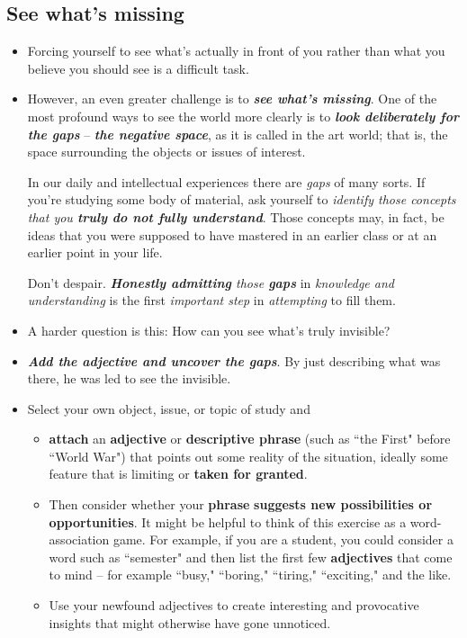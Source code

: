 \documentclass[11pt]{article}
\begin{document}
\subsection{See what's missing}
\begin{itemize}
\item Forcing yourself to see what’s actually in front of you rather than what you believe you should see is a difficult task. 

\item However, an even greater challenge is to \emph{\textbf{see what’s missing}}. One of the most profound ways to see the world more clearly is to \emph{\textbf{look deliberately for the gaps}} -- \emph{\textbf{the negative space}}, as it is called in the art world; that is, the space surrounding the objects or issues of interest. 

In our daily and intellectual experiences there are \emph{gaps} of many sorts. If you’re studying some body of material, ask yourself to \emph{identify those concepts that you \textbf{truly do not fully understand}}. Those concepts may, in fact, be ideas that you were supposed to have mastered in an earlier class or at an earlier point in your life.

Don’t despair. \emph{\textbf{Honestly admitting} those \textbf{gaps}} in \emph{knowledge and understanding} is the first \emph{important step} in \emph{attempting} to fill them. 

\item A harder question is this: How can you see what’s truly invisible?

\item \emph{\textbf{Add the adjective and uncover the gaps}}. By just describing what was there, he was led to see the invisible.

\item \begin{exercise}
Select your own object, issue, or topic of study and 
\begin{itemize}
\item \textbf{attach} an \textbf{adjective} or \textbf{descriptive phrase} (such as ``the First" before ``World War") that points out some reality of the situation, ideally some feature that is limiting or \textbf{taken for granted}. 

\item Then consider whether your \textbf{phrase} \textbf{suggests new possibilities or opportunities}. It might be helpful to think of this exercise as a word-association game. For example, if you are a student, you could consider a word such as ``semester" and then list the first few \textbf{adjectives} that come to mind -- for example ``busy," ``boring," ``tiring," ``exciting," and the like.

\item  Use your newfound adjectives to create interesting and provocative insights that might otherwise have gone unnoticed.
\end{itemize}
\end{exercise}


\end{itemize}
\end{document}
